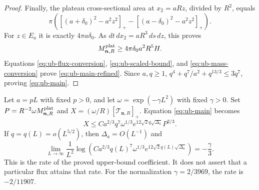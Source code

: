 \begin{proof}
Finally, the plateau cross-sectional area at $x_2=aRz$, divided by
$R^2$, equals
\[
 \pi\left(
 [(a+\delta_0)^2-a^2z^2]_+
 -[(a-\delta_0)^2-a^2z^2]_+\right).
\]
For $z\in E_a$ it is exactly $4\pi a\delta_0$.  As
$dt\,dx_2=aR^3\,ds\,dz$, this proves
\begin{equation}\label{eq:ub-mass-conversion}
 M^{\rm plat}_{\boldsymbol n,R}\ge4\pi\delta_0a^2R^5H.
\end{equation}
Equations \eqref{eq:ub-flux-conversion}, \eqref{eq:ub-scaled-bound},
and \eqref{eq:ub-mass-conversion} prove
\eqref{eq:ub-main-refined}.  Since $a,q\ge1$,
$q^4+q^7/a^2+q^{13/3}\le3q^7$, proving \eqref{eq:ub-main}.
\end{proof}

\begin{remark}\label{rem:ub-window}
Let $a=pL$ with fixed $p>0$, and let
$\omega=\exp(-\gamma L^2)$ with fixed $\gamma>0$.  Set
$P=R^{-2}\omega M^{\rm plat}_{\boldsymbol n,R}$ and
$X=(\omega/R)[\mathcal T_{\boldsymbol n,R}]_+$.
Equation \eqref{eq:ub-main} becomes
\[
 X\le C a^{2/3}q^7\omega^{1/3}e^{12\sqrt2q\sqrt{\Delta_a}}P^{2/3}.
\]
If $q=q(L)=o(L^{5/2})$, then $\Delta_a=O(L^{-1})$ and
\[
 \lim_{L\to\infty}\frac1{L^2}
   \log\left(Ca^{2/3}q(L)^7\omega^{1/3}
                   e^{12\sqrt2q(L)\sqrt{\Delta_a}}\right)
 =-\frac\gamma3.
\]
This is the rate of the proved upper-bound coefficient.  It does not
assert that a particular flux attains that rate.  For the normalization
$\gamma=2/3969$, the rate is $-2/11907$.
\end{remark}
